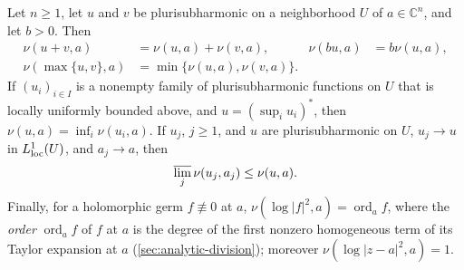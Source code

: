 \begin{proposition}\label{prop:lelong-calculus}
Let $n\geq1$, let $u$ and $v$ be plurisubharmonic on a neighborhood $U$ of $a\in\mathbb C^n$, and let $b>0$. Then
\[
 \begin{aligned}
 \nu(u+v,a)&=\nu(u,a)+\nu(v,a),&\nu(bu,a)&=b\nu(u,a),\\
 \nu(\max\{u,v\},a)&=\min\{\nu(u,a),\nu(v,a)\}.
 \end{aligned}
\]
If $(u_i)_{i\in I}$ is a nonempty family of plurisubharmonic functions on $U$ that is locally uniformly bounded above, and $u=(\sup_iu_i)^*$, then $\nu(u,a)=\inf_i\nu(u_i,a)$. If $u_j$, $j\geq1$, and $u$ are plurisubharmonic on $U$, $u_j\to u$ in $L^1_{\mathrm{loc}}(U)$, and $a_j\to a$, then
\begin{equation}\label{eq:lelong-upper-semicontinuity}
 \varlimsup_j\nu(u_j,a_j)\leq\nu(u,a).
\end{equation}
Finally, for a holomorphic germ $f\not\equiv0$ at $a$, $\nu(\log|f|^2,a)=\operatorname{ord}_af$, where the \emph{order} $\operatorname{ord}_af$ of $f$ at $a$ is the degree of the first nonzero homogeneous term of its Taylor expansion at $a$ (\cref{sec:analytic-division}); moreover $\nu(\log|z-a|^2,a)=1$.
\end{proposition}
